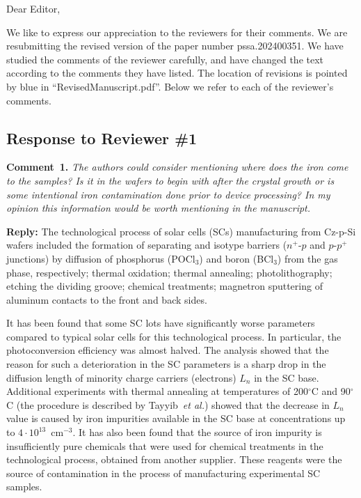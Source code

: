 \documentclass{WileyMSP-template}
\begin{document}
Dear Editor,

We like to express our appreciation to the reviewers for their comments.
We are resubmitting the revised version of the paper number pssa.202400351.
We have studied the comments of the reviewer carefully, and have changed the text according to the comments they
have listed.
The location of revisions is pointed by blue in ``RevisedManuscript.pdf''.
Below we refer to each of the reviewer’s comments.


\subsection*{Response to Reviewer \#1 }

\noindent
\textcolor[rgb]{0.00,0.50,1.00}{\textbf{Comment~1.}}
\emph{The authors could consider mentioning where does the iron come to the samples?
Is it in the wafers to begin with after the crystal growth or is some intentional iron contamination done prior to device processing?
In my opinion this information would be worth mentioning in the manuscript.}

\noindent
\textcolor[rgb]{0.51,0.00,0.00}{\textbf{Reply:}}
The technological process of solar cells (SCs) manufacturing from Cz-p-Si wafers included the formation of separating and isotype barriers
($n^+$-$p$ and $p$-$p^+$ junctions) by diffusion of phosphorus (POCl$_3$) and boron (BCl$_3$) from the gas phase, respectively;
thermal oxidation;
thermal annealing;
photolithography;
etching the dividing groove;
chemical treatments;
magnetron sputtering of aluminum contacts to the front and back sides.

It has been found that some SC lots have significantly worse parameters compared to typical solar cells for this technological process.
In particular, the photoconversion efficiency was almost halved.
The analysis showed that the reason for such a deterioration in the SC parameters is a sharp drop in the diffusion length of minority charge carriers (electrons) $L_n$ in the SC base.
Additional experiments with thermal annealing at temperatures of 200$^\circ$C and 90$^\circ$C
(the procedure is described by Tayyib~\emph{et al.}\cite{TAYYIB201221})
showed that the decrease in $L_n$ value is caused by iron impurities available in the SC base at concentrations up to $4\cdot10^{13}$~cm$^{-3}$.
It has also been found that the source of iron impurity is insufficiently pure chemicals that were used for chemical treatments in the technological process, obtained from another supplier.
These reagents were the source of contamination in the process of manufacturing experimental SC samples.
\end{document}
